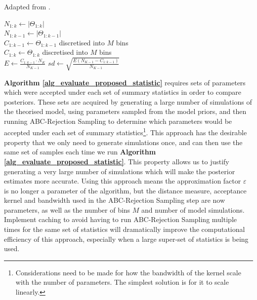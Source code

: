 \documentclass[11pt,a4paper]{article}
\theoremstyle{break}
\begin{document}
  \begin{box_algorithm}\label{alg_evaluate_proposed_statistic}
    Adapted from \cite[]{Approximately_sufficient_statistics_and_bayesian_computation}.
    \par
    \begin{algorithm}[H]
      $N_{1:k}\leftarrow\left|\Theta_{1:k}\right|$\\
      $N_{1:k-1}\leftarrow\left|\Theta_{1:k-1}\right|$\\
      $C_{1:k-1}\leftarrow\Theta_{1:k-1}$ discretised into $M$ bins\\
      $C_{1:k}\leftarrow\Theta_{1:k}$ discretised into $M$ bins\\
      $E\leftarrow\displaystyle\frac{C_{1:k-1}\cdot N_K}{N_{K-1}}$\label{alg_expected_value}
      $sd\leftarrow\displaystyle\sqrt{\frac{E(N_{K-1}-C_{1:k-1})}{N_{K-1}}}$\label{alg_standard_deviation}
       { \label{alg_line_condition}
      } 
    \end{algorithm}
  \end{box_algorithm}

  \par \textbf{Algorithm \ref{alg_evaluate_proposed_statistic}} requires sets of parameters which were accepted under each set of summary statistics in order to compare posteriors. These sets are acquired by generating a large number of simulations of the theorised model, using parameters sampled from the model priors, and then running ABC-Rejection Sampling to determine which parameters would be accepted under each set of summary statistics\footnote{Considerations need to be made for how the bandwidth of the kernel scale with the number of parameters. The simplest solution is for it to scale linearly.}. This approach has the desirable property that we only need to generate simulations once, and can then use the same set of samples each time we run \textbf{Algorithm \ref{alg_evaluate_proposed_statistic}}. This property allows us to justify generating a very large number of simulations which will make the posterior estimates more accurate. Using this approach means the approximation factor $\varepsilon$ is no longer a parameter of the algorithm, but the distance measure, acceptance kernel and bandwidth used in the ABC-Rejection Sampling step are now parameters, as well as the number of bins $M$ and number of model simulations. Implement caching to avoid having to run ABC-Rejection Sampling multiple times for the same set of statistics will dramatically improve the computational efficiency of this approach, especially when a large super-set of statistics is being used.
\end{document}
